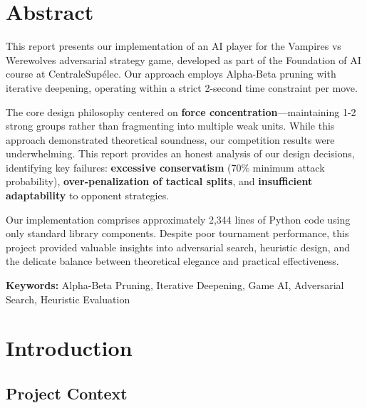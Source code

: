 \documentclass[11pt,a4paper]{article}
\begin{document}
\tableofcontents
\newpage

\section*{Abstract}

This report presents our implementation of an AI player for the Vampires vs Werewolves adversarial strategy game, developed as part of the Foundation of AI course at CentraleSup\'elec. Our approach employs Alpha-Beta pruning with iterative deepening, operating within a strict 2-second time constraint per move.

The core design philosophy centered on \textbf{force concentration}---maintaining 1-2 strong groups rather than fragmenting into multiple weak units. While this approach demonstrated theoretical soundness, our competition results were underwhelming. This report provides an honest analysis of our design decisions, identifying key failures: \textbf{excessive conservatism} (70\% minimum attack probability), \textbf{over-penalization of tactical splits}, and \textbf{insufficient adaptability} to opponent strategies.

Our implementation comprises approximately 2,344 lines of Python code using only standard library components. Despite poor tournament performance, this project provided valuable insights into adversarial search, heuristic design, and the delicate balance between theoretical elegance and practical effectiveness.

\textbf{Keywords:} Alpha-Beta Pruning, Iterative Deepening, Game AI, Adversarial Search, Heuristic Evaluation

\newpage

\section{Introduction}

\subsection{Project Context}
\end{document}
